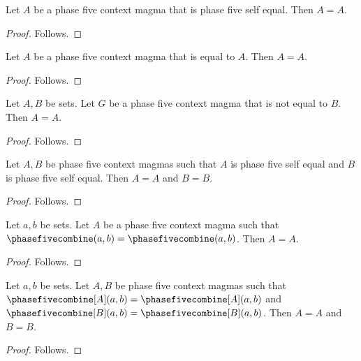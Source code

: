 


\begin{proposition}\label{notion_structure_right_modifier}
    Let $A$ be a phase five context magma that is phase five self equal.
    Then $A=A$.
\end{proposition}
\begin{proof}
    Follows.
\end{proof}

\begin{proposition}\label{notion_structure_intrinsic_modifier}
    Let $A$ be a phase five context magma that is equal to $A$.
    Then $A=A$.
\end{proposition}
\begin{proof}
    Follows.
\end{proof}

\begin{proposition}\label{notion_structure_negative_modifier}
    Let $A,B$ be sets.
    Let $G$ be a phase five context magma that is not equal to $B$.
    Then $A=A$.
\end{proposition}
\begin{proof}
    Follows.
\end{proof}

\begin{proposition}\label{notion_structure_shared_residual}
    Let $A,B$ be phase five context magmas such that
        $A$ is phase five self equal and $B$ is phase five self equal.
    Then $A=A$ and $B=B$.
\end{proposition}
\begin{proof}
    Follows.
\end{proof}

\begin{proposition}\label{notion_structure_singular_receiver}
    Let $a,b$ be sets.
    Let $A$ be a phase five context magma such that
        $\phasefivecombine(a,b)=\phasefivecombine(a,b)$.
    Then $A=A$.
\end{proposition}
\begin{proof}
    Follows.
\end{proof}

\begin{proposition}\label{notion_structure_explicit_receivers}
    Let $a,b$ be sets.
    Let $A,B$ be phase five context magmas such that
        $\phasefivecombine[A](a,b)=\phasefivecombine[A](a,b)$ and
        $\phasefivecombine[B](a,b)=\phasefivecombine[B](a,b)$.
    Then $A=A$ and $B=B$.
\end{proposition}
\begin{proof}
    Follows.
\end{proof}

